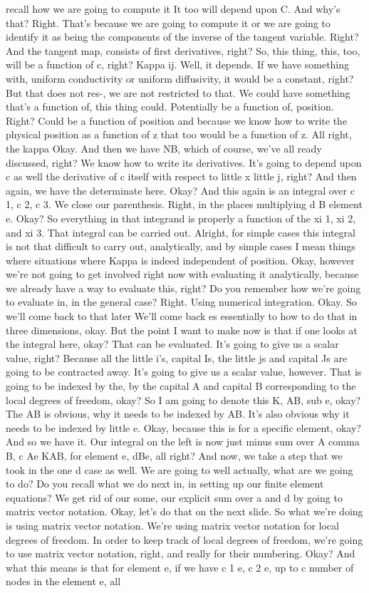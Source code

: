 \documentclass[10pt]{article}
\begin{document}
recall how we are going to compute it It too will depend upon C. And why's that? Right. That's because we are going to compute it or we are going to identify it as being the components of the inverse of the tangent variable. Right? And the tangent map, consists of first derivatives, right? So, this thing, this, too, will be a function of c, right? Kappa ij. Well, it depends. If we have something with, uniform conductivity or uniform diffusivity, it would be a constant, right? But that does not res-, we are not restricted to that. We could have something that's a function of, this thing could. Potentially be a function of, position. Right? Could be a function of position and because we know how to write the physical position as a function of z that too would be a function of z. All right, the kappa Okay. And then we have NB, which of course, we've all ready discussed, right? We know how to write its derivatives. It's going to depend upon c as well the derivative of c itself with respect to little x little j, right? And then again, we have the determinate here. Okay? And this again is an integral over c 1, c 2, c 3. We close our parenthesis. Right, in the places multiplying d B element e. Okay? So everything in that integrand is properly a function of the xi 1, xi 2, and xi 3. That integral can be carried out. Alright, for simple cases this integral is not that difficult to carry out, analytically, and by simple cases I mean things where situations where Kappa is indeed independent of position. Okay, however we're not going to get involved right now with evaluating it analytically, because we already have a way to evaluate this, right? Do you remember how we're going to evaluate in, in the general case? Right. Using numerical integration. Okay. So we'll come back to that later We'll come back es essentially to how to do that in three dimensions, okay. But the point I want to make now is that if one looks at the integral here, okay? That can be evaluated. It's going to give us a scalar value, right? Because all the little i's, capital Is, the little js and capital Js are going to be contracted away. It's going to give us a scalar value, however. That is going to be indexed by the, by the capital A and capital B corresponding to the local degrees of freedom, okay? So I am going to denote this K, AB, sub e, okay? The AB is obvious, why it needs to be indexed by AB. It's also obvious why it needs to be indexed by little e. Okay, because this is for a specific element, okay? And so we have it. Our integral on the left is now just minus sum over A comma B, c Ae KAB, for element e, dBe, all right? And now, we take a step that we took in the one d case as well. We are going to well actually, what are we going to do? Do you recall what we do next in, in setting up our finite element equations? We get rid of our some, our explicit sum over a and d by going to matrix vector notation. Okay, let's do that on the next slide. So what we're doing is using matrix vector notation. We're using matrix vector notation for local degrees of freedom. In order to keep track of local degrees of freedom, we're going to use matrix vector notation, right, and really for their numbering. Okay? And what this means is that for element e, if we have c 1 e, c 2 e, up to c number of nodes in the element e, all 
\end{document}
